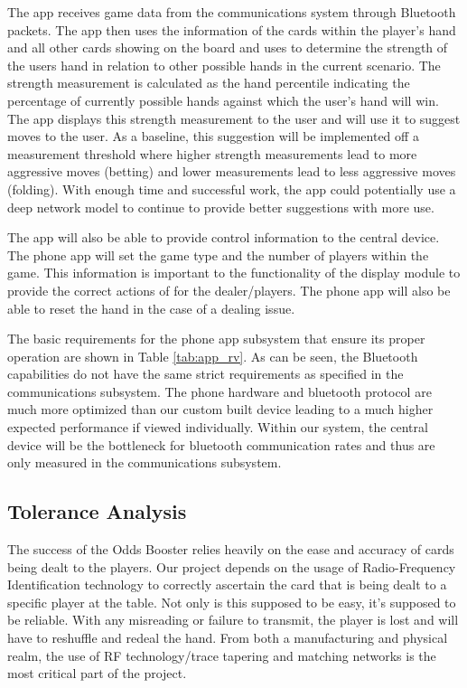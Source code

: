\documentclass[12pt]{article}
\begin{document}
The app receives game data from the communications system through Bluetooth packets. The app then uses the information of the cards within the player's hand and all other cards showing on the board and uses to determine the strength of the users hand in relation to other possible hands in the current scenario. The strength measurement is calculated as the hand percentile indicating the percentage of currently possible hands against which the user's hand will win. The app displays this strength measurement to the user and will use it to suggest moves to the user. As a baseline, this suggestion will be implemented off a measurement threshold where higher strength measurements lead to more aggressive moves (betting) and lower measurements lead to less aggressive moves (folding). With enough time and successful work, the app could potentially use a deep network model to continue to provide better suggestions with more use.

The app will also be able to provide control information to the central device. The phone app will set the game type and the number of players within the game. This information is important to the functionality of the display module to provide the correct actions of for the dealer/players. The phone app will also be able to reset the hand in the case of a dealing issue. 

The basic requirements for the phone app subsystem that ensure its proper operation are shown in Table \ref{tab:app_rv}. As can be seen, the Bluetooth capabilities do not have the same strict requirements as specified in the communications subsystem. The phone hardware and bluetooth protocol are much more optimized than our custom built device leading to a much higher expected performance if viewed individually. Within our system, the central device will be the bottleneck for bluetooth communication rates and thus are only measured in the communications subsystem.

\subsection{Tolerance Analysis}

The success of the Odds Booster relies heavily on the ease and accuracy of cards being dealt to the players. Our project depends on the usage of Radio-Frequency Identification technology to correctly ascertain the card that is being dealt to a specific player at the table. Not only is this supposed to be easy, it's supposed to be reliable. With any misreading or failure to transmit, the player is lost and will have to reshuffle and redeal the hand. From both a manufacturing and physical realm, the use of RF technology/trace tapering and matching networks is the most critical part of the project.
\end{document}

